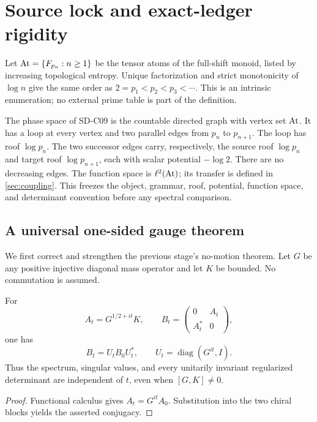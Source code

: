 \section{Source lock and exact-ledger rigidity}
\label{sec:rigidity}

Let $\operatorname{At}=\{F_{p_n}:n\ge1\}$ be the tensor atoms of the full-shift monoid,
listed by increasing topological entropy.  Unique factorization and strict
monotonicity of $\log n$ give the same order as
$2=p_1<p_2<p_3<\cdots$.  This is an intrinsic enumeration; no external
prime table is part of the definition.

The phase space of SD-C09 is the countable directed graph with vertex set
$\operatorname{At}$.  It has a loop at every vertex and two parallel edges from $p_n$ to
$p_{n+1}$.  The loop has roof $\log p_n$.  The two successor edges carry,
respectively, the source roof $\log p_n$ and target roof $\log p_{n+1}$,
each with scalar potential $-\log2$.  There are no decreasing edges.  The
function space is $\ell^2(\operatorname{At})$; its transfer is defined in
\cref{sec:coupling}.  This freezes the object, grammar, roof, potential,
function space, and determinant convention before any spectral comparison.

\subsection{A universal one-sided gauge theorem}

We first correct and strengthen the previous stage's no-motion theorem.  Let
$G$ be any positive injective diagonal mass operator and let $K$ be bounded.
No commutation is assumed.

\begin{theorem}
\label{thm:one-sided-gauge}
For
\[
 A_t=G^{1/2+it}K,
 \qquad
 B_t=\begin{pmatrix}0&A_t\\A_t^*&0\end{pmatrix},
\]
one has
\[
 B_t=U_tB_0U_t^*,
 \qquad U_t=\operatorname{diag}(G^{it},I).
\]
Thus the spectrum, singular values, and every unitarily invariant regularized
determinant are independent of $t$, even when $[G,K]\ne0$.
\end{theorem}

\begin{proof}
Functional calculus gives $A_t=G^{it}A_0$.  Substitution into the two chiral
blocks yields the asserted conjugacy.
\end{proof}

